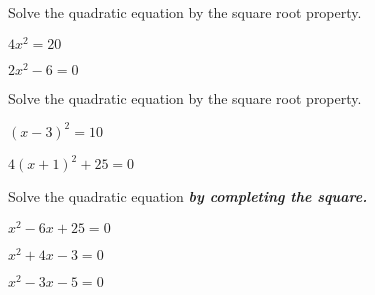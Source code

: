 \newpage

\begin{exercise}
	Solve the quadratic equation by the square root property. \\
	\begin{enumerate*}[label={(\arabic*)~~}]
		\item $4x^2=20$
		\item $2x^2-6=0$
		\hfill\null
	\end{enumerate*}
\end{exercise}

\vfill
\begin{center} \hfill
\end{center}


\begin{exercise}
	Solve the quadratic equation by the square root property. \\
	\begin{enumerate*}[label={(\arabic*)~~}]
		\item $(x-3)^2=10$
		\item $4(x+1)^2+25=0$
		\hfill\null
	\end{enumerate*}
\end{exercise}

\vfill
\begin{center} \hfill
\end{center}

\newpage

\begin{exercise}Solve the quadratic equation \textbf{\em by completing the square.}
	\\
	\begin{enumerate*}[label={(\arabic*)~}]
		\item $x^2-6x+25=0$
		\item $x^2+4x-3=0$
		\item $x^2-3x-5=0$
		\hfill\null
	\end{enumerate*}
\end{exercise}

